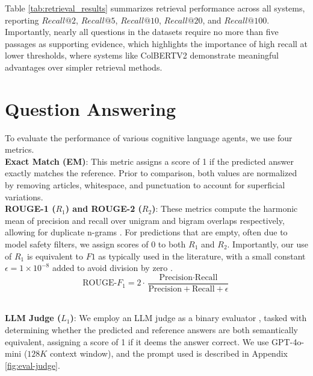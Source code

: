 \noindent Table \ref{tab:retrieval_results} summarizes retrieval performance across all systems, reporting $Recall@2$, $Recall@5$, $Recall@10$, $Recall@20$, and $Recall@100$. Importantly, nearly all questions in the datasets require no more than five passages as supporting evidence, which highlights the importance of high recall at lower thresholds, where systems like ColBERTV2 demonstrate meaningful advantages over simpler retrieval methods. \\



\section{Question Answering}

To evaluate the performance of various cognitive language agents, we use four metrics.\\

\noindent \textbf{Exact Match (EM)}: This metric assigns a score of 1 if the predicted answer exactly matches the reference. Prior to comparison, both values are normalized by removing articles, whitespace, and punctuation to account for superficial variations.\\

\noindent \textbf{ROUGE-1 ($R_1$) and ROUGE-2 ($R_2$)}: These metrics compute the harmonic mean of precision and recall over unigram and bigram overlaps respectively, allowing for duplicate n-grams \cite{lin-2004-rouge}. For predictions that are empty, often due to model safety filters, we assign scores of 0 to both $R_1$ and $R_2$. Importantly, our use of $R_1$ is equivalent to $F1$ as typically used in the literature, with a small constant $\epsilon=1 \times 10^{-8}$ added to avoid division by zero \cite{mrqa-2021-machine}.\\

\begin{equation}
    \text{ROUGE-}F_1 = 2 \cdot \frac{\text{Precision} \cdot \text{Recall}}{\text{Precision} + \text{Recall} + \epsilon}
\end{equation}

\noindent \\ \textbf{LLM Judge ($L_1$)}: We employ an LLM judge as a binary evaluator \cite{li2024llmsasjudgescomprehensivesurveyllmbased}, tasked with determining whether the predicted and reference answers are both semantically equivalent, assigning a score of 1 if it deems the answer correct. We use GPT-4o-mini ($128K$ context window), and the prompt used is described in Appendix \ref{fig:eval-judge}. \\

